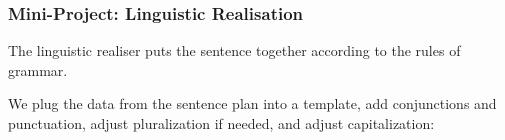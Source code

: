 \begin{frame}
\frametitle{Mini-Project: Linguistic Realisation}

The linguistic realiser puts the sentence together according to the rules of grammar.

\vspace{12pt}

We plug the data from the sentence plan into a template,
add conjunctions and punctuation, adjust pluralization if needed,
and adjust capitalization:

\vspace{12pt}

\begin{center}

\end{center}

\end{frame}